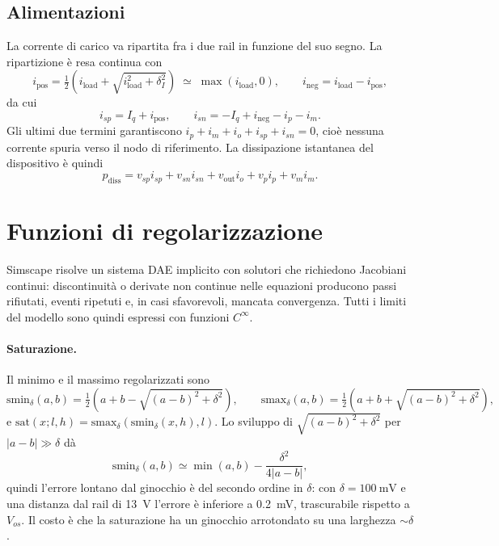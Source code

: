 \documentclass[11pt,a4paper]{article}
\begin{document}
\subsection{Alimentazioni}

La corrente di carico va ripartita fra i due rail in funzione del suo
segno. La ripartizione è resa continua con
\begin{equation}
  i_{\mathrm{pos}} = \tfrac{1}{2}\left(i_{\mathrm{load}} + \sqrt{i_{\mathrm{load}}^{2}+\delta_I^{2}}\right)
  \;\simeq\; \max(i_{\mathrm{load}},0),
  \qquad
  i_{\mathrm{neg}} = i_{\mathrm{load}} - i_{\mathrm{pos}},
\end{equation}
da cui
\begin{equation}
  i_{sp} = I_q + i_{\mathrm{pos}},
  \qquad
  i_{sn} = -I_q + i_{\mathrm{neg}} - i_p - i_m .
\end{equation}
Gli ultimi due termini garantiscono $i_p+i_m+i_o+i_{sp}+i_{sn}=0$, cioè
nessuna corrente spuria verso il nodo di riferimento. La dissipazione
istantanea del dispositivo è quindi
\begin{equation}
  p_{\mathrm{diss}} = v_{sp} i_{sp} + v_{sn} i_{sn} + v_{\mathrm{out}} i_o
  + v_p i_p + v_m i_m .
\end{equation}

\section{Funzioni di regolarizzazione}
\label{sec:smooth}

Simscape risolve un sistema DAE implicito con solutori che richiedono
Jacobiani continui: discontinuità o derivate non continue nelle equazioni
producono passi rifiutati, eventi ripetuti e, in casi sfavorevoli, mancata
convergenza. Tutti i limiti del modello sono quindi espressi con funzioni
$C^{\infty}$.

\paragraph{Saturazione.} Il minimo e il massimo regolarizzati sono
\begin{equation}
  \mathrm{smin}_\delta(a,b) = \tfrac{1}{2}\left(a+b-\sqrt{(a-b)^2+\delta^2}\right),
  \qquad
  \mathrm{smax}_\delta(a,b) = \tfrac{1}{2}\left(a+b+\sqrt{(a-b)^2+\delta^2}\right),
\end{equation}
e $\mathrm{sat}(x;l,h)=\mathrm{smax}_\delta\!\left(\mathrm{smin}_\delta(x,h),l\right)$.
Lo sviluppo di $\sqrt{(a-b)^2+\delta^2}$ per $|a-b|\gg\delta$ dà
\begin{equation}
  \mathrm{smin}_\delta(a,b) \simeq \min(a,b) - \frac{\delta^{2}}{4|a-b|},
\end{equation}
quindi l'errore lontano dal ginocchio è del secondo ordine in $\delta$: con
$\delta=\SI{100}{\milli\volt}$ e una distanza dal rail di \SI{13}{\volt}
l'errore è inferiore a \SI{0.2}{\milli\volt}, trascurabile rispetto a
$V_{os}$. Il costo è che la saturazione ha un ginocchio arrotondato su una
larghezza $\sim\delta$.
\end{document}
